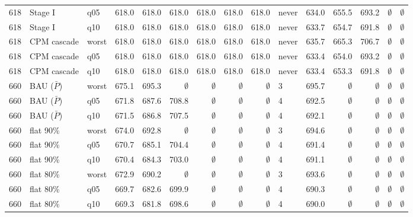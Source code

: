 \documentclass[11pt,a4paper]{article}
\begin{document}
\begin{longtable}{lllrrrrrrlrrrrr}
618 & Stage I & q05 & 618.0 & 618.0 & 618.0 & 618.0 & 618.0 & 618.0 & never & 634.0 & 655.5 & 693.2 & $\emptyset$ & $\emptyset$ \\
618 & Stage I & q10 & 618.0 & 618.0 & 618.0 & 618.0 & 618.0 & 618.0 & never & 633.7 & 654.7 & 691.8 & $\emptyset$ & $\emptyset$ \\
618 & CPM cascade & worst & 618.0 & 618.0 & 618.0 & 618.0 & 618.0 & 618.0 & never & 635.7 & 665.3 & 706.7 & $\emptyset$ & $\emptyset$ \\
618 & CPM cascade & q05 & 618.0 & 618.0 & 618.0 & 618.0 & 618.0 & 618.0 & never & 633.4 & 654.0 & 693.2 & $\emptyset$ & $\emptyset$ \\
618 & CPM cascade & q10 & 618.0 & 618.0 & 618.0 & 618.0 & 618.0 & 618.0 & never & 633.4 & 653.3 & 691.8 & $\emptyset$ & $\emptyset$ \\
660 & BAU ($\bar P$) & worst & 675.1 & 695.3 & $\emptyset$ & $\emptyset$ & $\emptyset$ & $\emptyset$ & 3 & 695.7 & $\emptyset$ & $\emptyset$ & $\emptyset$ & $\emptyset$ \\
660 & BAU ($\bar P$) & q05 & 671.8 & 687.6 & 708.8 & $\emptyset$ & $\emptyset$ & $\emptyset$ & 4 & 692.5 & $\emptyset$ & $\emptyset$ & $\emptyset$ & $\emptyset$ \\
660 & BAU ($\bar P$) & q10 & 671.5 & 686.8 & 707.5 & $\emptyset$ & $\emptyset$ & $\emptyset$ & 4 & 692.1 & $\emptyset$ & $\emptyset$ & $\emptyset$ & $\emptyset$ \\
660 & flat 90\% & worst & 674.0 & 692.8 & $\emptyset$ & $\emptyset$ & $\emptyset$ & $\emptyset$ & 3 & 694.6 & $\emptyset$ & $\emptyset$ & $\emptyset$ & $\emptyset$ \\
660 & flat 90\% & q05 & 670.7 & 685.1 & 704.4 & $\emptyset$ & $\emptyset$ & $\emptyset$ & 4 & 691.4 & $\emptyset$ & $\emptyset$ & $\emptyset$ & $\emptyset$ \\
660 & flat 90\% & q10 & 670.4 & 684.3 & 703.0 & $\emptyset$ & $\emptyset$ & $\emptyset$ & 4 & 691.1 & $\emptyset$ & $\emptyset$ & $\emptyset$ & $\emptyset$ \\
660 & flat 80\% & worst & 672.9 & 690.2 & $\emptyset$ & $\emptyset$ & $\emptyset$ & $\emptyset$ & 3 & 693.6 & $\emptyset$ & $\emptyset$ & $\emptyset$ & $\emptyset$ \\
660 & flat 80\% & q05 & 669.7 & 682.6 & 699.9 & $\emptyset$ & $\emptyset$ & $\emptyset$ & 4 & 690.3 & $\emptyset$ & $\emptyset$ & $\emptyset$ & $\emptyset$ \\
660 & flat 80\% & q10 & 669.3 & 681.8 & 698.6 & $\emptyset$ & $\emptyset$ & $\emptyset$ & 4 & 690.0 & $\emptyset$ & $\emptyset$ & $\emptyset$ & $\emptyset$ \\

\end{longtable}
\end{document}

